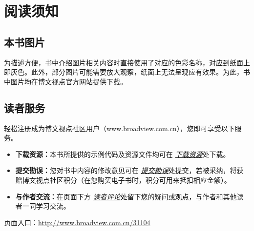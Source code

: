 \chapter{阅读须知}

\section*{本书图片}

为描述方便，书中介绍图片相关内容时直接使用了对应的色彩名称，对应到纸面上即灰色。此外，部分图片可能需要放大观察，纸面上无法呈现应有效果。为此，书中图片均在博文视点官方网站提供下载。

\section*{读者服务}

轻松注册成为博文视点社区用户（www.broadview.com.cn{}），您即可享受以下服务。

\begin{itemize}
\item \textbf{下载资源：}本书所提供的示例代码及资源文件均可在 \underline{\emph{下载资源}}处下载。

\item \textbf{提交勘误：}您对书中内容的修改意见可在 \underline{\emph{提交勘误}}处提交，若被采纳，将获赠博文视点社区积分（在您购买电子书时，积分可用来抵扣相应金额）。

\item \textbf{与作者交流：}在页面下方 \underline{\emph{读者评论}}处留下您的疑问或观点，与作者和其他读者一同学习交流。
\end{itemize}

页面入口：\url{http://www.broadview.com.cn/31104}

\begin{centering}
\end{centering}
